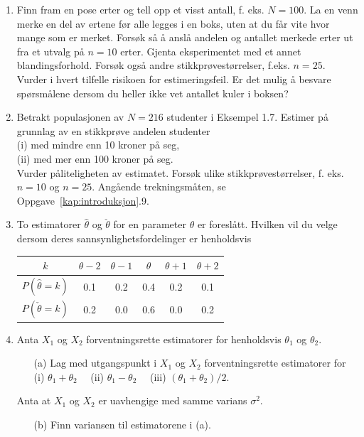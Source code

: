 \begin{enumerate}
\item Finn fram en pose erter og tell opp et visst antall, f. eks.
$N=100$. La en venn merke en del av ertene før alle legges i
en boks, uten at du får vite hvor mange som er merket.
Forsøk så å anslå andelen og antallet merkede erter ut fra
et utvalg på $n=10$ erter. Gjenta eksperimentet med et annet
blandingsforhold. Forsøk også andre stikkprøvestørrelser,
f.eks. $n=25$. Vurder i hvert tilfelle risikoen for
estimeringsfeil. Er det mulig å besvare spørsmålene dersom
du heller ikke vet antallet kuler i boksen?

\item Betrakt populasjonen av $N=216$ studenter i Eksempel 1.7.
Estimer på grunnlag av en stikkprøve andelen studenter \\
(i)  med mindre enn 10 kroner på seg,\\
(ii) med mer enn 100 kroner på seg. \\
Vurder påliteligheten av estimatet.
Forsøk ulike stikkprøvestørrelser, f. eks. $n=10$ og $n=25$.
Angående trekningsmåten, se Oppgave~\ref*{kap:introduksjon}.9.

\item To estimatorer $\hat{\theta}$ og $\check{\theta}$ for en parameter
$\theta$ er foreslått. Hvilken vil du velge dersom deres
sannsynlighetsfordelinger er henholdsvis
\begin{center}
\begin{tabular}{c|ccccc}
 $k$ & $\theta -2$ &$\theta -1$ &$\theta$ &$\theta +1$ &$\theta +2$ \\ \hline
 $P(\hat{\theta}=k)$& 0.1 & 0.2 & 0.4 & 0.2 & 0.1 \\                       
 $P(\check{\theta}=k)$& 0.2 & 0.0 & 0.6 & 0.0 & 0.2
\end{tabular}
\end{center}

\item Anta $X_1$ og $X_2$ forventningsrette estimatorer for
henholdsvis $\theta _1$ og $\theta _2$.
\begin{itemize}
\item[(a)] Lag med utgangspunkt i $X_1$ og $X_2$ forventningsrette
estimatorer for \\
(i)   $\theta _1 + \theta _2$ \ \
(ii)  $\theta _1 - \theta _2$ \ \
(iii) $(\theta _1 + \theta _2)/2$.
\end{itemize}
Anta at $X_1$ og $X_2$ er uavhengige med samme varians $\sigma ^2$.
\begin{itemize}
\item[(b)] Finn variansen til estimatorene i (a).
\end{itemize}


\end{enumerate}
